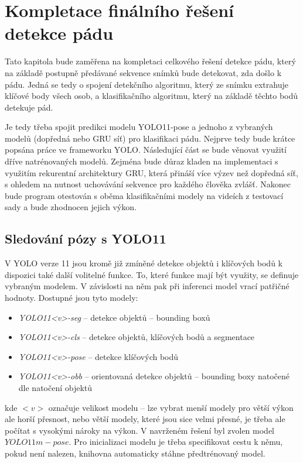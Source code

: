 \chapter{Kompletace finálního řešení detekce pádu}
\label{chap:detectionProgram}

Tato kapitola bude zaměřena na kompletaci celkového řešení detekce pádu, který
na základě postupně předávané sekvence snímků bude detekovat, zda došlo k pádu.
Jedná se tedy o spojení detekčního algoritmu, který ze snímku extrahuje klíčové
body všech osob, a klasifikačního algoritmu, který na základě těchto bodů
detekuje pád.

Je tedy třeba spojit predikci modelu YOLO11-pose a jednoho z vybraných modelů
(dopředná nebo GRU síť) pro klasifikaci pádu. Nejprve tedy bude krátce popsána
práce ve frameworku YOLO. Následující část se bude věnovat využití dříve
natrénovaných modelů. Zejména bude důraz kladen na implementaci s využitím
rekurentní architektury GRU, která přináší více výzev než dopředná síť, s
ohledem na nutnost uchovávání sekvence pro každého člověka zvlášť. Nakonec bude
program otestován s oběma klasifikačními modely na videích z testovací sady a
bude zhodnocen jejich výkon.

\section{Sledování pózy s YOLO11}

V YOLO verze 11 jsou kromě již zmíněné detekce objektů i klíčových bodů k
dispozici také další volitelné funkce. To, které funkce mají být využity, se
definuje vybraným modelem. V závislosti na něm pak při inferenci model vrací
patřičné hodnoty. Dostupné jsou tyto modely:
\begin{itemize}
    \item \textit{YOLO11<v>-seg } – detekce objektů – bounding boxů
    \item \textit{YOLO11<v>-cls } – detekce objektů, klíčových bodů a segmentace
    \item \textit{YOLO11<v>-pose} – detekce klíčových bodů
    \item \textit{YOLO11<v>-obb } – orientovaná detekce objektů – bounding boxy natočené dle natočení objektů
\end{itemize}

kde $<v>$ označuje velikost modelu – lze vybrat menší modely pro větší výkon
ale horší přesnost, nebo větší modely, které jsou sice velmi přesné, je třeba
ale počítat s vysokými nároky na výkon. V navrženém řešení byl zvolen model
$YOLO11m-pose$. Pro inicializaci modelu je třeba specifikovat cestu k němu,
pokud není nalezen, knihovna automaticky stáhne předtrénovaný model.

